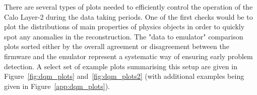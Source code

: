 \hspace{10pt} There are several types of plots needed to efficiently control the operation of the Calo Layer-2 during the data taking periods. One of the first checks would be to plot the distributions of main properties of physics objects in order to quickly spot any anomalies in the reconstruction. The "data to emulator" comparison plots sorted either by the overall agreement or disagreement between the firmware and the emulator represent a systematic way of ensuring early problem detection.  A select set of example plots summarising this setup are given in Figure~\ref{fig:dqm_plots} and~\ref{fig:dqm_plots2} (with additional examples being given in Figure~\ref{app:dqm_plots}).
\begin{figure}[htbp]
  \centering
    \\
\end{figure}
